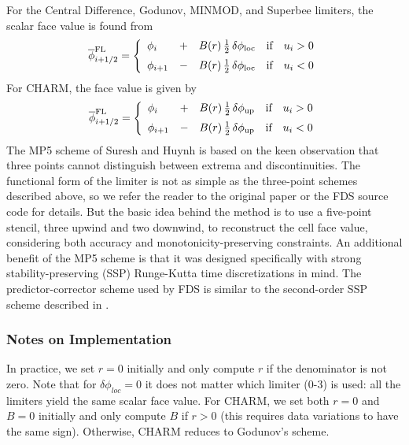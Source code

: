 \noindent For the Central Difference, Godunov, MINMOD, and Superbee limiters, the scalar face value is found from
\begin{equation}
\label{eqn_flux_limiter}
\overline{\phi}^{\rm FL}_{i+1/2} = \left\{ \begin{array}{lcll} \phi_i &+& B(r) \,\frac{1}{2} \,\delta \phi_{\rm loc} & \mbox{if} \quad u_i>0 \vspace{0.2 cm}\\
\phi_{i+1} &-& B(r) \,\frac{1}{2} \,\delta \phi_{\rm loc} & \mbox{if} \quad u_i<0 \end{array} \right.
\end{equation}
For CHARM, the face value is given by~\cite{Kempf:2003}
\begin{equation}
\label{eqn_charm_limiter}
\overline{\phi}^{\rm FL}_{i+1/2} = \left\{ \begin{array}{lcll} \phi_i &+& B(r) \,\frac{1}{2} \,\delta \phi_{\rm up} & \mbox{if} \quad u_i>0 \vspace{0.2 cm}\\
\phi_{i+1} &-& B(r) \,\frac{1}{2} \,\delta \phi_{\rm up} & \mbox{if} \quad u_i<0 \end{array} \right.
\end{equation}
The MP5 scheme of Suresh and Huynh \cite{Suresh:1997} is based on the keen observation that three points cannot distinguish between extrema and discontinuities.  The functional form of the limiter is not as simple as the three-point schemes described above, so we refer the reader to the original paper or the FDS source code for details.  But the basic idea behind the method is to use a five-point stencil, three upwind and two downwind, to reconstruct the cell face value, considering both accuracy and monotonicity-preserving constraints.  An additional benefit of the MP5 scheme is that it was designed specifically with strong stability-preserving (SSP) Runge-Kutta time discretizations in mind.  The predictor-corrector scheme used by FDS is similar to the second-order SSP scheme described in \cite{Gottlieb:2001}.


\subsubsection{Notes on Implementation}

In practice, we set $r=0$ initially and only compute $r$ if the denominator is not zero.  Note that for $\delta \phi_{loc}=0$ it does not matter which limiter (0-3) is used: all the limiters yield the same scalar face value.  For CHARM, we set both $r=0$ and $B=0$ initially and only compute $B$ if $r>0$ (this requires data variations to have the same sign). Otherwise, CHARM reduces to Godunov's scheme.

